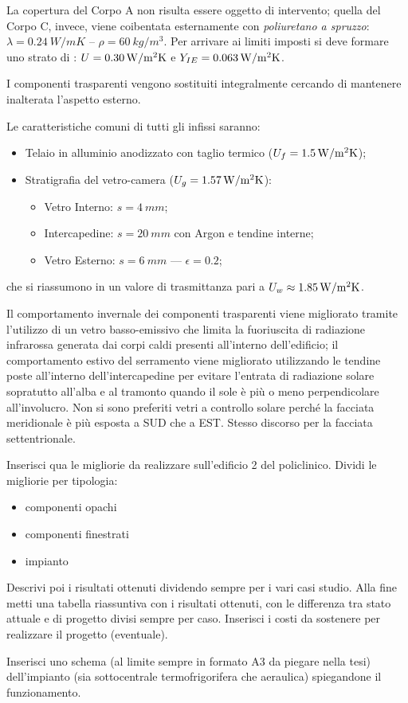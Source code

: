 La copertura del Corpo A non risulta essere oggetto di intervento; quella del Corpo C, invece, viene coibentata esternamente con \emph{poliuretano a spruzzo}: $\lambda=\SI{0.24}{W/mK}$ -- $\rho=\SI{60}{kg/m^3}$. Per arrivare ai limiti imposti si deve formare uno strato di : $U=\SI{0.30}{\trasm}$ e $Y_{IE}=\SI{0.063}{\trasm}$.

I componenti trasparenti vengono sostituiti integralmente cercando di mantenere inalterata l'aspetto esterno. 

Le caratteristiche comuni di tutti gli infissi saranno:
\begin{itemize}
	\item Telaio in alluminio anodizzato con taglio termico ($U_f=\SI{1.5}{\trasm}$);
	\item Stratigrafia del vetro-camera ($U_g=\SI{1.57}{\trasm}$):
		\begin{itemize}
			\item Vetro Interno: $s=\SI{4}{mm}$;
			\item Intercapedine: $s=\SI{20}{mm}$ con Argon e tendine interne;
			\item Vetro Esterno: $s=\SI{6}{mm}$ --- $\epsilon=0.2$;
		\end{itemize}
\end{itemize}
che si riassumono in un valore di trasmittanza pari a $U_w \approx \SI{1.85}{\trasm}$.

Il comportamento invernale dei componenti trasparenti viene migliorato tramite l'utilizzo di un vetro basso-emissivo che limita la fuoriuscita di radiazione infrarossa generata dai corpi caldi presenti all'interno dell'edificio; il comportamento estivo del serramento viene migliorato utilizzando le tendine poste all'interno dell'intercapedine per evitare l'entrata di radiazione solare sopratutto all'alba e al tramonto quando il sole è più o meno perpendicolare all'involucro. Non si sono preferiti vetri a controllo solare perché la facciata meridionale è più esposta a SUD che a EST. Stesso discorso per la facciata settentrionale.

\vspace{2cm}
Inserisci qua le migliorie da realizzare sull'edificio 2 del policlinico. Dividi le migliorie per tipologia:
\begin{itemize}
	\item componenti opachi
	\item componenti finestrati
	\item impianto
\end{itemize}
Descrivi poi i risultati ottenuti dividendo sempre per i vari casi studio. Alla fine metti una tabella riassuntiva con i risultati ottenuti, con le differenza tra stato attuale e di progetto divisi sempre per caso. Inserisci i costi da sostenere per realizzare il progetto (eventuale).

Inserisci uno schema (al limite sempre in formato A3 da piegare nella tesi) dell'impianto (sia sottocentrale termofrigorifera che aeraulica) spiegandone il funzionamento.